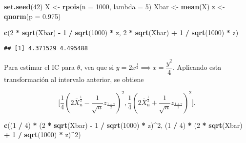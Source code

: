\documentclass[
  12pt,
]{book}
\newenvironment{Shaded}{\begin{snugshade}}{\end{snugshade}}
\newcommand{\DataTypeTok}[1]{\textcolor[rgb]{0.13,0.29,0.53}{#1}}
\newcommand{\DecValTok}[1]{\textcolor[rgb]{0.00,0.00,0.81}{#1}}
\newcommand{\FloatTok}[1]{\textcolor[rgb]{0.00,0.00,0.81}{#1}}
\newcommand{\KeywordTok}[1]{\textcolor[rgb]{0.13,0.29,0.53}{\textbf{#1}}}
\newcommand{\NormalTok}[1]{#1}
\newcommand{\OperatorTok}[1]{\textcolor[rgb]{0.81,0.36,0.00}{\textbf{#1}}}
\newcommand{\StringTok}[1]{\textcolor[rgb]{0.31,0.60,0.02}{#1}}
\begin{document}
\begin{Shaded}
\begin{Highlighting}[]
\KeywordTok{set.seed}\NormalTok{(}\DecValTok{42}\NormalTok{)}
\NormalTok{X \textless{}{-}}\StringTok{ }\KeywordTok{rpois}\NormalTok{(}\DataTypeTok{n =} \DecValTok{1000}\NormalTok{, }\DataTypeTok{lambda =} \DecValTok{5}\NormalTok{)}
\NormalTok{Xbar \textless{}{-}}\StringTok{ }\KeywordTok{mean}\NormalTok{(X)}
\NormalTok{z \textless{}{-}}\StringTok{ }\KeywordTok{qnorm}\NormalTok{(}\DataTypeTok{p =} \FloatTok{0.975}\NormalTok{)}

\KeywordTok{c}\NormalTok{(}\DecValTok{2} \OperatorTok{*}\StringTok{ }\KeywordTok{sqrt}\NormalTok{(Xbar) }\OperatorTok{{-}}\StringTok{ }\DecValTok{1} \OperatorTok{/}\StringTok{ }\KeywordTok{sqrt}\NormalTok{(}\DecValTok{1000}\NormalTok{) }\OperatorTok{*}\StringTok{ }\NormalTok{z, }\DecValTok{2} \OperatorTok{*}\StringTok{ }\KeywordTok{sqrt}\NormalTok{(Xbar) }\OperatorTok{+}\StringTok{ }\DecValTok{1} \OperatorTok{/}\StringTok{ }\KeywordTok{sqrt}\NormalTok{(}\DecValTok{1000}\NormalTok{) }\OperatorTok{*}\StringTok{ }\NormalTok{z)}
\end{Highlighting}
\end{Shaded}

\begin{verbatim}
## [1] 4.371529 4.495488
\end{verbatim}

Para estimar el IC para \(\theta\), vea que si \(y=2x^{\frac12} \implies x = \dfrac{y^2}{4}\). Aplicando esta transformación al intervalo anterior, se obtiene

\[\bigg[\dfrac 14 \left(2\bar X_n^{\frac 12} -\dfrac 1{\sqrt n}
z_{\frac{1+\gamma}2}\right)^2,\dfrac 14 \left(2\bar X_n^{\frac 12} +\dfrac 1{\sqrt n}
z_{\frac{1+\gamma}2}\right)^2\bigg].\]

\begin{Shaded}
\begin{Highlighting}[]
\KeywordTok{c}\NormalTok{((}\DecValTok{1} \OperatorTok{/}\StringTok{ }\DecValTok{4}\NormalTok{) }\OperatorTok{*}\StringTok{ }\NormalTok{(}\DecValTok{2} \OperatorTok{*}\StringTok{ }\KeywordTok{sqrt}\NormalTok{(Xbar) }\OperatorTok{{-}}\StringTok{ }\DecValTok{1} \OperatorTok{/}\StringTok{ }\KeywordTok{sqrt}\NormalTok{(}\DecValTok{1000}\NormalTok{) }\OperatorTok{*}\StringTok{ }\NormalTok{z)}\OperatorTok{\^{}}\DecValTok{2}\NormalTok{, (}\DecValTok{1} \OperatorTok{/}\StringTok{ }\DecValTok{4}\NormalTok{) }\OperatorTok{*}\StringTok{ }\NormalTok{(}\DecValTok{2} \OperatorTok{*}\StringTok{ }\KeywordTok{sqrt}\NormalTok{(Xbar) }\OperatorTok{+}\StringTok{ }\DecValTok{1} \OperatorTok{/}\StringTok{ }\KeywordTok{sqrt}\NormalTok{(}\DecValTok{1000}\NormalTok{) }\OperatorTok{*}\StringTok{ }\NormalTok{z)}\OperatorTok{\^{}}\DecValTok{2}\NormalTok{)}
\end{Highlighting}
\end{Shaded}
\end{document}
